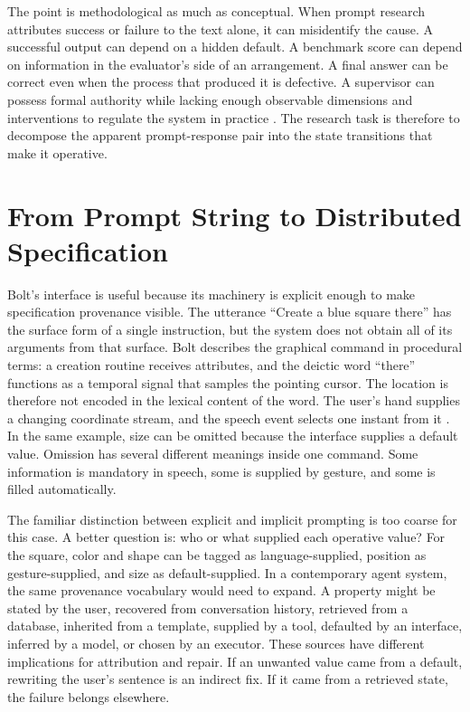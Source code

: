 \documentclass[11pt]{article}
\begin{document}
The point is methodological as much as conceptual. When prompt research attributes success or failure to the text alone, it can misidentify the cause. A successful output can depend on a hidden default. A benchmark score can depend on information in the evaluator's side of an arrangement. A final answer can be correct even when the process that produced it is defective. A supervisor can possess formal authority while lacking enough observable dimensions and interventions to regulate the system in practice \citep{pfungst1911clever,solarlezama2007sketching,ashby1956introduction}. The research task is therefore to decompose the apparent prompt-response pair into the state transitions that make it operative.

\section{From Prompt String to Distributed Specification}

Bolt's interface is useful because its machinery is explicit enough to make specification provenance visible. The utterance ``Create a blue square there'' has the surface form of a single instruction, but the system does not obtain all of its arguments from that surface. Bolt describes the graphical command in procedural terms: a creation routine receives attributes, and the deictic word ``there'' functions as a temporal signal that samples the pointing cursor. The location is therefore not encoded in the lexical content of the word. The user's hand supplies a changing coordinate stream, and the speech event selects one instant from it \citep{bolt1980put}. In the same example, size can be omitted because the interface supplies a default value. Omission has several different meanings inside one command. Some information is mandatory in speech, some is supplied by gesture, and some is filled automatically.

The familiar distinction between explicit and implicit prompting is too coarse for this case. A better question is: who or what supplied each operative value? For the square, color and shape can be tagged as language-supplied, position as gesture-supplied, and size as default-supplied. In a contemporary agent system, the same provenance vocabulary would need to expand. A property might be stated by the user, recovered from conversation history, retrieved from a database, inherited from a template, supplied by a tool, defaulted by an interface, inferred by a model, or chosen by an executor. These sources have different implications for attribution and repair. If an unwanted value came from a default, rewriting the user's sentence is an indirect fix. If it came from a retrieved state, the failure belongs elsewhere.
\end{document}
